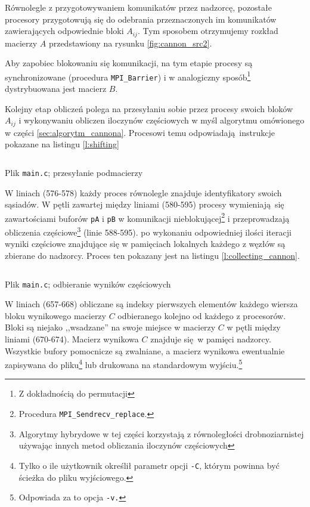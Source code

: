 Równolegle z przygotowywaniem komunikatów przez nadzorcę, pozostałe procesory przygotowują się do odebrania przeznaczonych im komunikatów zawierających odpowiednie bloki \(A_{ij}\). Tym sposobem otrzymujemy rozkład macierzy \(A\) przedstawiony na rysunku \ref{fig:cannon_src2}. 

Aby zapobiec blokowaniu się komunikacji, na tym etapie procesy są synchronizowane (procedura \texttt{MPI\_Barrier}) i w analogiczny sposób\footnote{Z dokładnością do permutacji} dystrybuowana jest macierz \(B\).

Kolejny etap obliczeń polega na przesyłaniu sobie przez procesy swoich bloków \(A_{ij}\) i wykonywaniu obliczen iloczynów częściowych w myśl algorytmu omówionego w części \ref{sec:algorytm_cannona}. Procesowi temu odpowiadają instrukcje pokazane na listingu \ref{l:shifting}

\begin{listing}[H]
\inputminted[fontsize=\footnotesize,bgcolor=bg,linenos,firstnumber=576,firstline=576,lastline=595]{c}{includes/listings/main.c}
\caption{Plik \texttt{main.c}; przesyłanie podmacierzy}
\label{l:shifting}
\end{listing}

W liniach (576-578) każdy proces równolegle znajduje identyfikatory swoich sąsiadów. W pętli zawartej między liniami (580-595) procesy wymieniają się zawartościami buforów \texttt{pA} i \texttt{pB} w komunikacji nieblokującej\footnote{Procedura \texttt{MPI\_Sendrecv\_replace}.} i przeprowadzają obliczenia częściowe\footnote{Algorytmy hybrydowe w tej części korzystają z równoległości drobnoziarnistej używając innych metod obliczania iloczynów częściowych} (linie 588-595). po wykonaniu odpowiedniej ilości iteracji wyniki częściowe znajdujące się w pamięciach lokalnych każdego z węzłów są zbierane do nadzorcy. Proces ten pokazany jest na listingu \ref{l:collecting_cannon}.

\begin{listing}[H]
\inputminted[fontsize=\footnotesize,bgcolor=bg,linenos,firstnumber=644,firstline=644,lastline=679]{c}{includes/listings/main.c}
\caption{Plik \texttt{main.c}; odbieranie wyników częściowych}
\label{l:collecting_cannon}
\end{listing}

W liniach (657-668) obliczane są indeksy pierwszych elementów każdego wiersza bloku wynikowego macierzy \(C\) odbieranego kolejno od każdego z procesorów. Bloki są niejako ,,wsadzane'' na swoje miejsce w macierzy \(C\) w pętli między liniami (670-674). Macierz wynikowa \(C\) znajduje się w pamięci nadzorcy. Wszystkie bufory pomocnicze są zwalniane, a macierz wynikowa ewentualnie zapisywana do pliku\footnote{Tylko o ile użytkownik określił parametr opcji \texttt{-C}, którym powinna być ścieżka do pliku wyjściowego.} lub drukowana na standardowym wyjściu.\footnote{Odpowiada za to opcja \texttt{-v.}}


